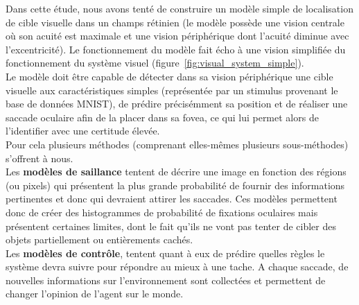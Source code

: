 Dans cette étude, nous avons tenté de construire un modèle simple de localisation de cible visuelle dans un champs rétinien (le modèle possède une vision centrale où son acuité est maximale et une vision périphérique dont l'acuité diminue avec l'excentricité). Le fonctionnement du modèle fait écho à une vision simplifiée du fonctionnement du système visuel (figure~\ref{fig:visual_system_simple})\autocite{Zhaoping2014}.\\
Le modèle doit être capable de détecter dans sa vision périphérique une cible visuelle aux caractéristiques simples (représentée par un stimulus provenant le base de données MNIST), de prédire précisémment sa position et de réaliser une saccade oculaire afin de la placer dans sa fovea, ce qui lui permet alors de l'identifier avec une certitude élevée.\\
Pour cela plusieurs méthodes (comprenant elles-mêmes plusieurs sous-méthodes) s'offrent à nous. \\
Les \textbf{modèles de saillance} tentent de décrire une image en fonction des régions (ou pixels) qui présentent la plus grande probabilité de fournir des informations pertinentes et donc qui devraient attirer les saccades. Ces modèles permettent donc de créer des histogrammes de probabilité de fixations oculaires mais présentent certaines limites, dont le fait qu'ils ne vont pas tenter de cibler des objets partiellement ou entièrements cachés\autocite{Butko2010}.\\
Les \textbf{modèles de contrôle}, tentent quant à eux de prédire quelles règles le système devra suivre pour répondre au mieux à une tache. A chaque saccade, de nouvelles informations sur l'environnement sont collectées et permettent de changer l'opinion de l'agent sur le monde\autocite{Butko2010}.
